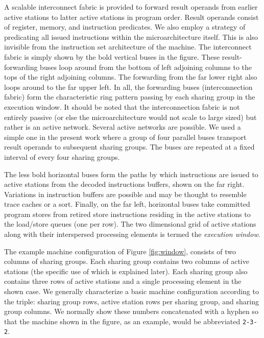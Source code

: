 \documentclass[10pt,dvips]{article}
\begin{document}
A scalable interconnect fabric 
is provided to forward result
operands from earlier active stations to latter active stations in
program order.  Result operands consist of register, memory, and
instruction predicates.  We also employ a strategy of predicating all
issued instructions within the microarchitecture itself.  This is also 
invisible from the instruction set architecture of the machine.
The interconnect fabric is simply shown by
the bold vertical buses in the figure.  These result-forwarding buses
loop around from the bottom of left adjoining columns to the tops of
the right adjoining columns.  The forwarding from the far lower right
also loops around to the far upper left.  In all, the forwarding
buses (interconnection fabric) form the characteristic ring pattern
passing by each sharing group in the execution window.
It should be noted that the interconnection fabric is not
entirely passive (or else the microarchitecture would not
scale to large sized) but rather is an active network.
Several active networks are possible.  We used a simple one
in the present work where a group of four parallel buses transport
result operands to subsequent sharing groups.  The buses are repeated
at a fixed interval of every four sharing groups.

The less bold horizontal buses
form the paths by which instructions are issued to active stations
from the decoded instructions buffers, shown on the far right.
Variations in instruction buffers are possible and may be thought
to resemble trace caches or a sort.
Finally, on the far left, horizontal buses take committed program
stores from retired store instructions residing in the active stations
to the load/store queues (one per row).
The two dimensional
grid of active stations along with their interspersed processing elements
is termed the \textit{execution window}.


The example 
machine configuration
of Figure \ref{fig:window}, 
consists of 
two columns of sharing groups.  Each sharing group contains two columns of
active stations (the specific use of which is explained later).
Each sharing group also contains three rows of active stations
and a single processing element in the shown case.  
We generally characterize
a basic machine configuration according to the triple: sharing group
rows, active station
rows per sharing group, and sharing group columns.  We normally
show these numbers concatenated with a hyphen so that the machine shown
in the figure, as an example, would be abbreviated {\tt 2-3-2}.
\end{document}
